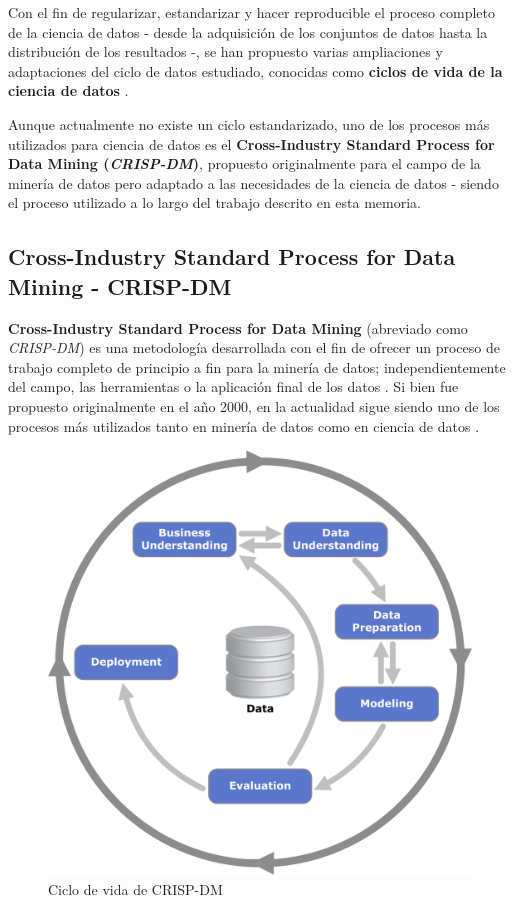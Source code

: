 Con el fin de regularizar, estandarizar y hacer reproducible el proceso completo de la ciencia de datos - desde la adquisición de los conjuntos de datos hasta la distribución de los resultados -, se han propuesto varias ampliaciones y adaptaciones del ciclo de datos estudiado, conocidas como \textbf{ciclos de vida de la ciencia de datos} \cite{datasciencelifecycle}. 

Aunque actualmente no existe un ciclo estandarizado, uno de los procesos más utilizados para ciencia de datos es el \textbf{Cross-Industry Standard Process for Data Mining (\textit{CRISP-DM})}, propuesto originalmente para el campo de la minería de datos pero adaptado a las necesidades de la ciencia de datos \cite{shearer2000crisp} - siendo el proceso utilizado a lo largo del trabajo descrito en esta memoria.

\subsection{Cross-Industry Standard Process for Data Mining - CRISP-DM}

\textbf{Cross-Industry Standard Process for Data Mining} (abreviado como \textit{CRISP-DM}) es una metodología desarrollada con el fin de ofrecer un proceso de trabajo completo de principio a fin para la minería de datos; independientemente del campo, las herramientas o la aplicación final de los datos \cite{shearer2000crisp}. Si bien fue propuesto originalmente en el año 2000, en la actualidad sigue siendo uno de los procesos más utilizados tanto en minería de datos como en ciencia de datos \cite{datasciencepmCRISPDMStill}.

\begin{figure}[h]
	\centering
	\includegraphics[width=0.6\linewidth]{figs/chapter2/crispdm}
	\caption{Ciclo de vida de CRISP-DM \cite{shearer2000crisp}}
	\label{fig:crispdm}
\end{figure}


